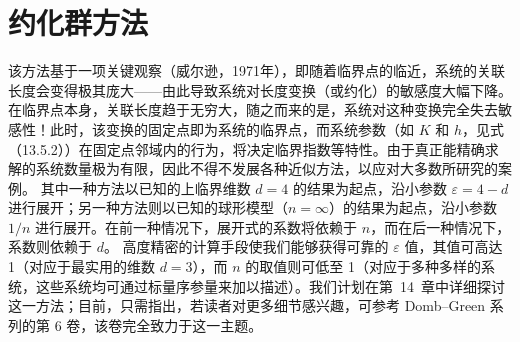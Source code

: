 \section{约化群方法}\label{ux7ea6ux5316ux7fa4ux65b9ux6cd5}
该方法基于一项关键观察（威尔逊，1971年），即随着临界点的临近，系统的关联长度会变得极其庞大——由此导致系统对长度变换（或约化）的敏感度大幅下降。在临界点本身，关联长度趋于无穷大，随之而来的是，系统对这种变换完全失去敏感性！此时，该变换的固定点即为系统的临界点，而系统参数（如 \(K\) 和 \(h\)，见式（13.5.2））在固定点邻域内的行为，将决定临界指数等特性。由于真正能精确求解的系统数量极为有限，因此不得不发展各种近似方法，以应对大多数所研究的案例。
其中一种方法以已知的上临界维数 \(d=4\) 的结果为起点，沿小参数 \(\varepsilon=4-d\) 进行展开；另一种方法则以已知的球形模型（\(n=\infty\)）的结果为起点，沿小参数 \(1/n\) 进行展开。在前一种情况下，展开式的系数将依赖于 \(n\)，而在后一种情况下，系数则依赖于 \(d\)。
高度精密的计算手段使我们能够获得可靠的 \(\varepsilon\) 值，其值可高达 1（对应于最实用的维数 \(d=3\)），而 \(n\) 的取值则可低至 1（对应于多种多样的系统，这些系统均可通过标量序参量来加以描述）。我们计划在第~14~章中详细探讨这一方法；目前，只需指出，若读者对更多细节感兴趣，可参考 Domb--Green 系列的第 6 卷，该卷完全致力于这一主题。
